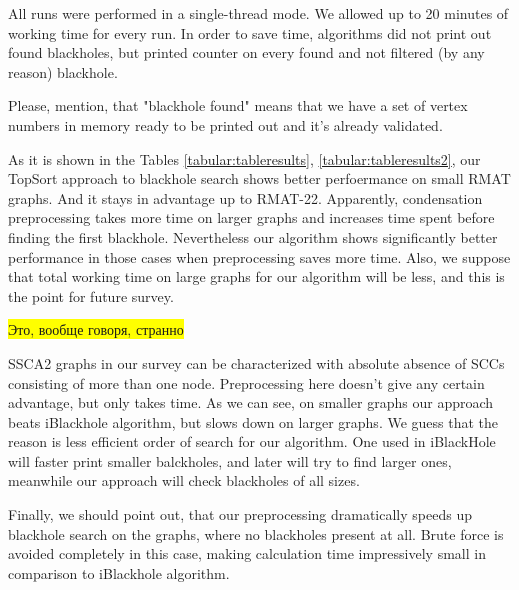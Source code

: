 \documentclass{svproc}
\newcommand{\FIXME}[1]{ %
	\colorbox{yellow}{#1}
}
\newcommand{\FIXME}[1]{ %
}
\begin{document}
All runs were performed in a single-thread mode. We allowed up to 20 minutes of working time for every run. In order to save time,
algorithms did not print out found blackholes, but printed counter on every found and not filtered (by any reason) blackhole.

Please, mention, that "blackhole found" means that we have a set of vertex numbers in memory ready to be printed out and it's already validated.

As it is shown in the Tables \ref{tabular:tableresults}, \ref{tabular:tableresults2}, our TopSort approach to blackhole search shows better perfoermance on small RMAT graphs.
And it stays in advantage up to RMAT-22. Apparently, condensation preprocessing takes more time on larger graphs and increases time spent before finding
the first blackhole. Nevertheless our algorithm shows significantly better performance in those cases when preprocessing saves more time. Also, we suppose
that total working time on large graphs for our algorithm will be less, and this is the point for future survey.

\FIXME{Это, вообще говоря, странно}
SSCA2 graphs in our survey can be characterized with absolute absence of SCCs consisting of more than one node. Preprocessing here doesn't give any
certain advantage, but only takes time. As we can see, on smaller graphs our approach beats iBlackhole algorithm, but slows down on larger graphs.
We guess that the reason is less efficient order of search for our algorithm. One used in iBlackHole will faster print smaller balckholes, and later will try
to find larger ones, meanwhile our approach will check blackholes of all sizes.

Finally, we should point out, that our preprocessing dramatically speeds up blackhole search on the graphs, where no blackholes present at all. Brute force is
avoided completely in this case, making calculation time impressively small in comparison to iBlackhole algorithm.
\end{document}
